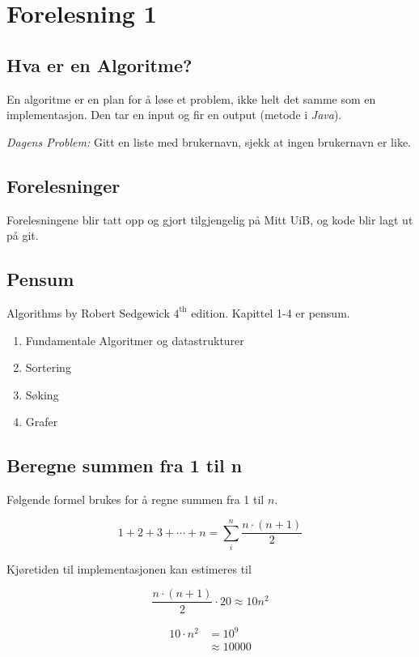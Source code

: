 \documentclass[twocolumn]{article}
\begin{document}
\section{Forelesning 1}

\subsection{Hva er en Algoritme?}

En algoritme er en plan for å løse et problem, ikke helt det samme som en implementasjon. Den tar en input og fir en output (metode i \textit{Java}).
\bigskip

\textit{Dagens Problem:} Gitt en liste med brukernavn, sjekk at ingen brukernavn er like.

\subsection{Forelesninger}
Forelesningene blir tatt opp og gjort tilgjengelig på Mitt UiB, og kode blir lagt ut på git.

\subsection{Pensum}
Algorithms by Robert Sedgewick \( 4^{\text{th}} \) edition. Kapittel 1-4 er pensum.

\begin{enumerate}
    \item Fundamentale Algoritmer og datastrukturer
    \item Sortering
    \item Søking
    \item Grafer
\end{enumerate}

\subsection{Beregne summen fra 1 til  n }
Følgende formel brukes for å regne summen fra 1 til \( n \).

\[ 1+2+3+\cdots + n = \sum_{i}^{n} \frac{n \cdot \left( n+1 \right)}{2} \]

Kjøretiden til implementasjonen kan estimeres til

\[ \frac{n \cdot \left( n + 1 \right)}{2}\cdot  20 \approx 10n^2 \]

\begin{align*}
    10 \cdot  n^2 &= 10^{9} \\
                  &\approx10000
\end{align*}
\end{document}
